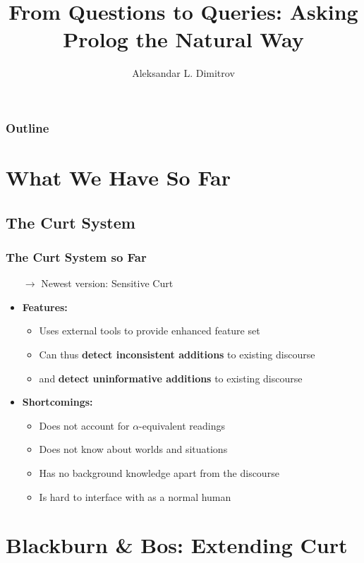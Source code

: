 \documentclass{beamer}
\title{From Questions to Queries: Asking Prolog the Natural Way}
\institute{Universität Tübingen}
\author{Aleksandar L. Dimitrov}
\newcommand{\stress}{\textbf}
\begin{document}
\begin{frame}
  \titlepage
\end{frame}

\begin{frame}
  \frametitle{Outline}
  \tableofcontents
\end{frame}

\section{What We Have So Far}

\subsection{The Curt System}
\begin{frame}
\frametitle{The Curt System so Far}
  \begin{itemize}
    \item[$\to$] Newest version: Sensitive Curt
    \item \stress{Features:}
    \begin{itemize}
      \item Uses external tools to provide enhanced feature set
      \item Can thus \stress{detect inconsistent additions} to existing discourse
      \item and \stress{detect uninformative additions} to existing discourse
    \end{itemize}
    \item \stress{Shortcomings:}
    \begin{itemize}
      \item Does not account for $\alpha$-equivalent readings
      \item Does not know about worlds and situations
      \item Has no background knowledge apart from the discourse
      \item Is hard to interface with as a normal human
    \end{itemize}
  \end{itemize}
\end{frame}

\section{Blackburn \& Bos: Extending Curt}
\end{document}
